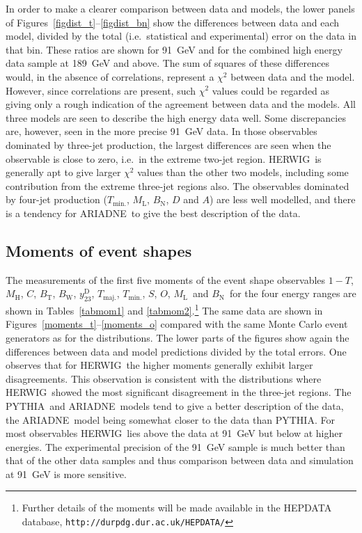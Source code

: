 \documentclass[12pt,a4paper,twoside]{article}
\newcommand{\bt}     {\ensuremath{B_{\mathrm{T}}}}
\newcommand{\bw}     {\ensuremath{B_{\mathrm{W}}}}
\newcommand{\bn}     {\ensuremath{B_{\mathrm{N}}}}
\newcommand{\mh}     {\ensuremath{M_{\mathrm{H}}}}
\newcommand{\ml}     {\ensuremath{M_{\mathrm{L}}}}
\newcommand{\thr}    {\ensuremath{1-T}}
\newcommand{\tma}    {\ensuremath{T_{\mathrm{maj.}}}}
\newcommand{\tmi}    {\ensuremath{T_{\mathrm{min.}}}}
\newcommand{\ytwothree}   {\ensuremath{y^{\mathrm{D}}_{23}}}
\newcommand{\Herwig}{\mbox{HERWIG}}
\newcommand{\Pythia}{\mbox{PYTHIA}}
\newcommand{\Ariadne}{\mbox{ARIADNE}}
\begin{document}
In order to make a clearer comparison between 
data and models, the lower panels of Figures~\ref{figdist_t}--\ref{figdist_bn}
show the differences between data and each model, divided by the total 
(i.e.\ statistical and experimental) 
error on the data in that bin.  These ratios are shown for 91~GeV
and for the combined high energy data sample at 189~GeV and above.
The sum of squares of these 
differences would, in the absence of correlations, represent a $\chi^2$ 
between  data and the model.  However, since correlations are 
present, such $\chi^2$ values could be 
regarded as giving only a rough indication of the agreement 
between data and the models.
All three models are seen to describe the high energy data well.
Some discrepancies are, however, seen in the more precise 91~GeV data.
In those observables dominated by three-jet production, 
the largest differences are seen when the observable is close
to zero, i.e.\ in the extreme two-jet region. \Herwig\ is generally
apt to give larger $\chi^2$ values than the other two models, 
including some contribution from the extreme three-jet regions also.
The observables dominated by four-jet production (\tmi, \ml, \bn,
$D$ and $A$) are less well modelled, and there is a tendency for 
\Ariadne\ to give the best description of the data.   

%
%
\subsection{ Moments of event shapes }
\label{sec_moments}

The measurements of the first five moments of the event shape observables
\thr, \mh, $C$, \bt, \bw, \ytwothree, \tma, \tmi, $S$, $O$, \ml\ and \bn\ 
for the four energy ranges are shown in Tables~\ref{tabmom1} and 
\ref{tabmom2}.\footnote{Further details of the moments
will be made available in the HEPDATA database, 
{\tt http://durpdg.dur.ac.uk/HEPDATA/}}  
The same data are shown
in Figures~\ref{moments_t}--\ref{moments_o}
compared with the same Monte Carlo event generators as
for the distributions.  
The lower parts of the figures show again the
differences between data and model predictions divided by the total
errors.  One observes that
for \Herwig\ the higher moments generally exhibit larger disagreements.  This
observation is consistent with the distributions where \Herwig\ showed 
the most significant
disagreement in the three-jet regions.  The \Pythia\ and \Ariadne\ models
tend to give a better description of the data, the \Ariadne\ model being
somewhat closer to the data than \Pythia.  For most observables \Herwig\
lies above the data at 91~GeV but below at higher energies.  The experimental
precision of the 91~GeV sample is much better than that 
of the other data samples and thus
comparison between data and simulation at 91~GeV is more sensitive.
\end{document}
